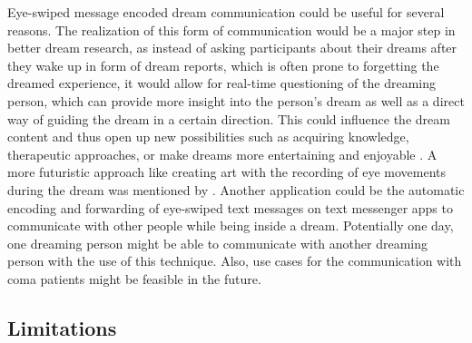 \documentclass{article}
\begin{document}
Eye-swiped message encoded dream communication could be useful for several reasons. The realization of this form of communication would be a major step in better dream research, as instead of asking participants about their dreams after they wake up in form of dream reports, which is often prone to forgetting the dreamed experience, it would allow for real-time questioning of the dreaming person, which can provide more insight into the person's dream as well as a direct way of guiding the dream in a certain direction. This could influence the dream content and thus open up new possibilities such as acquiring knowledge, therapeutic approaches, or make dreams more entertaining and enjoyable \citep{appel2022sd}. A more futuristic approach like creating art with the recording of eye movements during the dream was mentioned by \citet{appel2022sd}. Another application could be the automatic encoding and forwarding of eye-swiped text messages on text messenger apps to communicate with other people while being inside a dream. Potentially one day, one dreaming person might be able to communicate with another dreaming person with the use of this technique. Also, use cases for the communication with coma patients might be feasible in the future.

\subsection*{Limitations}
\end{document}
